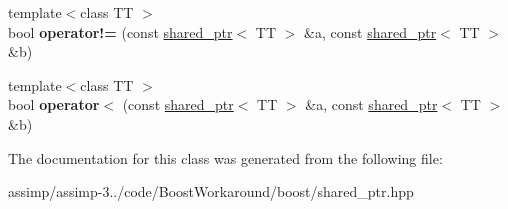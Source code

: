 \begin{DoxyCompactItemize}
\item 
\hypertarget{classboost_1_1shared__ptr_a960849c31832fd027be829e5eaa72da8}{{\footnotesize template$<$class T\+T $>$ }\\bool {\bfseries operator!=} (const \hyperlink{classboost_1_1shared__ptr}{shared\+\_\+ptr}$<$ T\+T $>$ \&a, const \hyperlink{classboost_1_1shared__ptr}{shared\+\_\+ptr}$<$ T\+T $>$ \&b)}\label{classboost_1_1shared__ptr_a960849c31832fd027be829e5eaa72da8}

\item 
\hypertarget{classboost_1_1shared__ptr_a4589a5474b1d8e689d92f17955e48f4a}{{\footnotesize template$<$class T\+T $>$ }\\bool {\bfseries operator$<$} (const \hyperlink{classboost_1_1shared__ptr}{shared\+\_\+ptr}$<$ T\+T $>$ \&a, const \hyperlink{classboost_1_1shared__ptr}{shared\+\_\+ptr}$<$ T\+T $>$ \&b)}\label{classboost_1_1shared__ptr_a4589a5474b1d8e689d92f17955e48f4a}

\end{DoxyCompactItemize}


The documentation for this class was generated from the following file\+:\begin{DoxyCompactItemize}
\item 
assimp/assimp-\/3../code/\+Boost\+Workaround/boost/shared\+\_\+ptr.\+hpp\end{DoxyCompactItemize}
